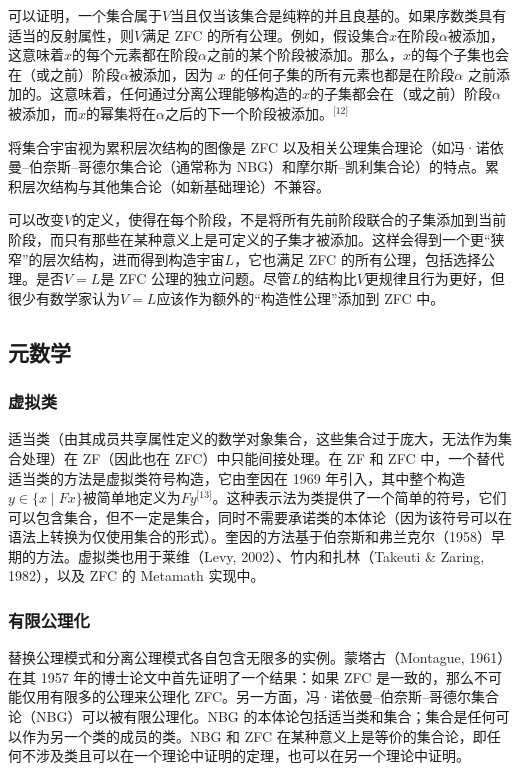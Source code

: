可以证明，一个集合属于\( V \)当且仅当该集合是纯粹的并且良基的。如果序数类具有适当的反射属性，则\( V \)满足 ZFC 的所有公理。例如，假设集合\( x \)在阶段\( \alpha \)被添加，这意味着\( x \)的每个元素都在阶段\( \alpha \)之前的某个阶段被添加。那么，\( x \)的每个子集也会在（或之前）阶段\( \alpha \)被添加，因为 \( x \) 的任何子集的所有元素也都是在阶段\( \alpha \) 之前添加的。这意味着，任何通过分离公理能够构造的\( x \)的子集都会在（或之前）阶段\( \alpha \)被添加，而\( x \)的幂集将在\( \alpha \)之后的下一个阶段被添加。\(^\text{[12]}\)

将集合宇宙视为累积层次结构的图像是 ZFC 以及相关公理集合理论（如冯·诺依曼–伯奈斯–哥德尔集合论（通常称为 NBG）和摩尔斯–凯利集合论）的特点。累积层次结构与其他集合论（如新基础理论）不兼容。

可以改变\( V \)的定义，使得在每个阶段，不是将所有先前阶段联合的子集添加到当前阶段，而只有那些在某种意义上是可定义的子集才被添加。这样会得到一个更“狭窄”的层次结构，进而得到构造宇宙\( L \)，它也满足 ZFC 的所有公理，包括选择公理。是否\( V = L \)是 ZFC 公理的独立问题。尽管\( L \)的结构比\( V \)更规律且行为更好，但很少有数学家认为\( V = L \)应该作为额外的“构造性公理”添加到 ZFC 中。
\subsection{元数学}  
\subsubsection{虚拟类}  
适当类（由其成员共享属性定义的数学对象集合，这些集合过于庞大，无法作为集合处理）在 ZF（因此也在 ZFC）中只能间接处理。在 ZF 和 ZFC 中，一个替代适当类的方法是虚拟类符号构造，它由奎因在 1969 年引入，其中整个构造\( y \in \{ x \mid Fx \} \)被简单地定义为\( Fy \)\(^\text{[13]}\)。这种表示法为类提供了一个简单的符号，它们可以包含集合，但不一定是集合，同时不需要承诺类的本体论（因为该符号可以在语法上转换为仅使用集合的形式）。奎因的方法基于伯奈斯和弗兰克尔（1958）早期的方法。虚拟类也用于莱维（Levy, 2002）、竹内和扎林（Takeuti & Zaring, 1982），以及 ZFC 的 Metamath 实现中。
\subsubsection{有限公理化}   
替换公理模式和分离公理模式各自包含无限多的实例。蒙塔古（Montague, 1961）在其 1957 年的博士论文中首先证明了一个结果：如果 ZFC 是一致的，那么不可能仅用有限多的公理来公理化 ZFC。另一方面，冯·诺依曼–伯奈斯–哥德尔集合论（NBG）可以被有限公理化。NBG 的本体论包括适当类和集合；集合是任何可以作为另一个类的成员的类。NBG 和 ZFC 在某种意义上是等价的集合论，即任何不涉及类且可以在一个理论中证明的定理，也可以在另一个理论中证明。
